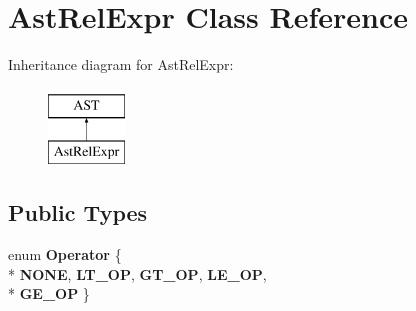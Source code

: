\hypertarget{classAstRelExpr}{\section{Ast\-Rel\-Expr Class Reference}
\label{classAstRelExpr}
}
Inheritance diagram for Ast\-Rel\-Expr\-:\begin{figure}[H]
\begin{center}
\leavevmode
\includegraphics[height=2.000000cm]{classAstRelExpr}
\end{center}
\end{figure}
\subsection*{Public Types}
\begin{DoxyCompactItemize}
\item 
enum {\bfseries Operator} \{ \\*
{\bfseries N\-O\-N\-E}, 
{\bfseries L\-T\-\_\-\-O\-P}, 
{\bfseries G\-T\-\_\-\-O\-P}, 
{\bfseries L\-E\-\_\-\-O\-P}, 
\\*
{\bfseries G\-E\-\_\-\-O\-P}
 \}
\end{DoxyCompactItemize}
